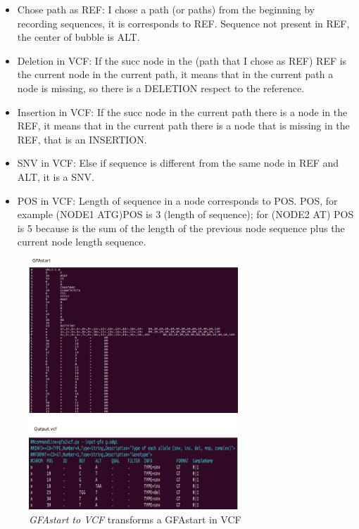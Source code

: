 \begin{itemize}
\item Chose path as REF: I chose a path (or paths) from the beginning by recording sequences, it is corresponds to REF. Sequence not present in REF, the center of bubble is ALT.


                    
\item Deletion in VCF: If the succ node in the (path that I chose as REF) REF is the current node in the current path, it means that in the current path a node is missing, so there is a DELETION respect to the reference.

\item Insertion in VCF: If the succ node in the current path there is a node in the REF, it means that in the current path there is a node that is missing in the REF, that is an INSERTION.

\item SNV in VCF: Else if sequence is different from the same node in REF and ALT, it is a SNV.

\item POS in VCF: Length of sequence in a node corresponds to POS.
POS, for example (NODE1 ATG)POS is 3 (length of sequence); for (NODE2 AT) POS is 5 because is the sum of the length of the previous node sequence plus the current node length sequence. \end{itemize}


\begin{figure}[H]
\centering
\includegraphics[width=0.70\textwidth]{fig/gfa2vcf.png}
\decoRule
\caption{\textit{GFAstart to VCF} transforms a GFAstart in VCF}
\label{fig:validation.png}
\end{figure}
